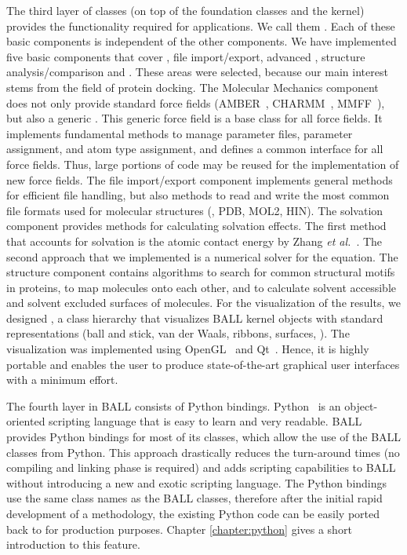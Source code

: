 The third layer of classes (on top of the foundation classes and the kernel)
provides the functionality required for applications. We call them
. Each of these basic components is independent of
the other components.  We have implemented five basic components that cover
, file import/export, advanced , structure analysis/comparison and . These
areas were selected, because our main interest stems from the field of protein
docking. The Molecular Mechanics component does not only provide standard
force fields (AMBER~\cite{AMBER95}, CHARMM~\cite{BBO+83},
MMFF~\cite{MMFF94a,MMFF94b,MMFF94c,MMFF94d,MMFF94e}), but also a generic
.  This generic force field is a base class for all force
fields. It implements fundamental methods to manage parameter files, parameter
assignment, and atom type assignment, and defines a common interface for all
force fields. Thus, large portions of code may be reused for the
implementation of new force fields.  The file import/export component
implements general methods for efficient file handling, but also methods to
read and write the most common file formats used for molecular structures
(\eg, PDB, MOL2, HIN). The solvation component provides methods for calculating
solvation effects. The first method that accounts for solvation is the atomic
contact energy by Zhang {\it et al.}~\cite{ZVC+97}. The second approach that
we implemented is a numerical solver for the  equation.  The
structure component contains algorithms to search for common structural motifs
in proteins, to map molecules onto each other, and to calculate solvent
accessible and solvent excluded surfaces of molecules. For the visualization
of the results, we designed , a class hierarchy that
visualizes BALL kernel objects with standard representations (ball and stick,
van der Waals, ribbons, surfaces, \etc). The visualization was implemented
using OpenGL~\cite{OpenGL} and Qt~\cite{QT}. Hence, it is highly portable and 
enables the user to produce state-of-the-art graphical user interfaces with a
minimum effort.

The fourth layer in BALL consists of Python bindings. Python~\cite{Python} is
an object-oriented scripting language that is easy to learn and very readable.
BALL provides Python bindings for most of its classes, which allow the use of
the BALL \CPP classes from Python. This approach drastically reduces the
turn-around times (no compiling and linking phase is required) and adds
scripting capabilities to BALL without introducing a new and exotic scripting
language. The Python bindings use the same class names as the BALL classes,
therefore after the initial rapid development of a methodology, the existing
Python code can be easily ported back to \CPP for production purposes.
Chapter \ref{chapter:python} gives a short introduction to this feature.
